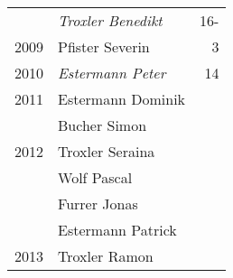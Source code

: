 {\begin{longtable}{ l l r }
                      & \emph{Troxler Benedikt}                   & 16-         \\
        2009          & Pfister Severin                           & 3           \\
        2010          & \emph{Estermann Peter}                    & 14          \\
        2011          & Estermann Dominik                         &             \\
                      & Bucher Simon                              &             \\
        2012          & Troxler Seraina                           &             \\
                      & Wolf Pascal                               &             \\
                      & Furrer Jonas                              &             \\
                      & Estermann Patrick                         &             \\
        2013          & Troxler Ramon                             &             \\
    \end{longtable}
    \unskip
    \unpenalty
    \unpenalty}


\begin{history}
    \unvbox\mitgliederbox
\end{history}

